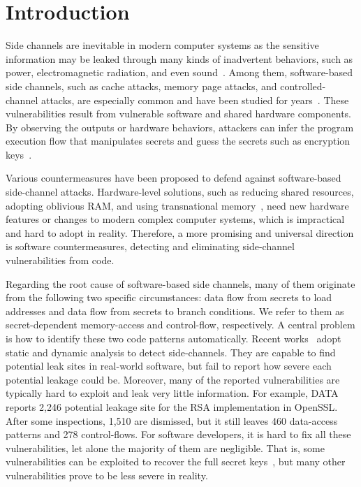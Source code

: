 \section{Introduction}
Side channels are inevitable in modern computer systems as the sensitive
information may be leaked through many kinds of inadvertent behaviors, such as power,
electromagnetic radiation, and even
sound~\cite{agrawal2002side,kar20178,chari1999towards,217605,genkin2014rsa}.
Among them, software-based side channels, such as cache attacks, memory page
attacks, and controlled-channel attacks, are especially common and have been
studied for
years~\cite{7163052,217543,217589,lee2017inferring,191010,liu2015last}. These
vulnerabilities result from vulnerable software and shared hardware components.
By observing the outputs or hardware behaviors, attackers can infer the program
execution flow that manipulates secrets and guess the secrets such as encryption
keys~\cite{Osvik2006,Gullasch:2011:CGB:2006077.2006784,203878,10.1007/978-3-540-45238-6_6}.

Various countermeasures have been proposed to defend against software-based
side-channel attacks. Hardware-level solutions, such as reducing shared
resources, adopting oblivious RAM, and using transnational
memory~\cite{203878,217537,shih2017t,Zhang:2015:HDL:2775054.2694372}, need new
hardware features or changes to modern complex computer systems, which is
impractical and hard to adopt in reality. Therefore, a more promising and
universal direction is software countermeasures, detecting and eliminating
side-channel vulnerabilities from code.

Regarding the root cause of software-based side channels, many of them originate
from the following two specific circumstances: data flow from secrets to load
addresses and data flow from secrets to branch conditions. We refer to them as
 secret-dependent memory-access and control-flow, respectively. A
central problem is how to identify these two code patterns automatically. Recent
works~\cite{203878,217537,Wichelmann:2018:MFF:3274694.3274741,Brotzman19Casym,236338,182946}
adopt static and dynamic analysis to detect side-channels. They are capable to find
potential leak sites in real-world software, but fail to report how severe each
potential leakage could be. Moreover, many of the reported vulnerabilities are typically
hard to exploit and leak very little information. For example,
DATA~\cite{217537} reports 2,246 potential leakage site for the RSA
implementation in OpenSSL\@. After some inspections, 1,510 are dismissed, but it
still leaves 460 data-access patterns and 278 control-flows. For software
developers, it is hard to fix all these vulnerabilities, let alone the majority
of them are negligible. That is, some vulnerabilities can be exploited to recover the
full secret keys~\cite{184415}, but many other vulnerabilities prove to be less
severe in reality.


